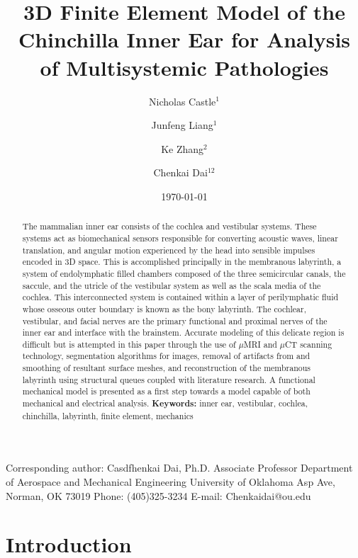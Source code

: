 \documentclass[12pt]{article}
\title{\textbf{3D Finite Element Model of the Chinchilla Inner Ear for Analysis of Multisystemic Pathologies}}
\author{Nicholas Castle$^1$ \and Junfeng Liang$^1$\and Ke Zhang$^2$\and Chenkai Dai$^{12}$}
\institute{$^1$School of Aerospace and Mechanical Engineering \\ $^2$Stephenson School of Biomedical Engineering \\ University of Oklahoma, Norman OK 73019}
\date{\today}
\begin{document}
\maketitle

\noindent Corresponding author: \newline
Casdfhenkai Dai, Ph.D. \newline
Associate Professor \newline
Department of Aerospace and Mechanical Engineering \newline
University of Oklahoma  Asp Ave, \newline
Norman, OK 73019 \newline
Phone: (405)325-3234 \newline
E-mail: Chenkaidai@ou.edu \newline


\begin{abstract}
The mammalian inner ear consists of the cochlea and vestibular systems. These systems act as biomechanical sensors responsible for converting acoustic waves, linear translation, and angular motion experienced by the head into sensible impulses encoded in 3D space. This is accomplished principally in the membranous labyrinth, a system of endolymphatic filled chambers composed of the three semicircular canals, the saccule, and the utricle of the vestibular system as well as the scala media of the cochlea. This interconnected system is contained within a layer of perilymphatic fluid whose osseous outer boundary is known as the bony labyrinth. The cochlear, vestibular, and facial nerves are the primary functional and proximal nerves of the inner ear and interface with the brainstem. Accurate modeling of this delicate region is difficult but is attempted in this paper through the use of $\mu$MRI and $\mu$CT scanning technology, segmentation algorithms for images, removal of artifacts from and smoothing of resultant surface meshes, and reconstruction of the membranous labyrinth using structural queues coupled with literature research. A functional mechanical model is presented as a first step towards a model capable of both mechanical and electrical analysis. \newline \newline \textbf{Keywords:} inner ear, vestibular, cochlea, chinchilla, labyrinth, finite element, mechanics
\end{abstract}


\section{Introduction}
\end{document}
